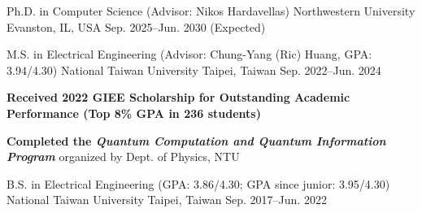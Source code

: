 

\begin{cventries}

    \cventry
    {Ph.D. in Computer Science (Advisor: Nikos Hardavellas)}
    {Northwestern University}
    {Evanston, IL, USA}
    {Sep. 2025--Jun. 2030 (Expected)}
    {
    }
    
    \cventry
    {M.S. in Electrical Engineering (Advisor: Chung-Yang (Ric) Huang, GPA: 3.94/4.30)}
    {National Taiwan University}
    {Taipei, Taiwan}
    {Sep. 2022--Jun. 2024}
    {
        \begin{cvitems}
            \item \textcolor{awesome}{\textbf{Received 2022 GIEE Scholarship for Outstanding Academic Performance (Top 8\% GPA in 236 students)}}
            \item \textcolor{awesome}{\textbf{Completed the \emph{Quantum Computation and Quantum Information Program}}} organized by Dept. of Physics, NTU
        \end{cvitems}
    }
    
    \cventry
    {B.S. in Electrical Engineering (GPA: 3.86/4.30; GPA since junior: 3.95/4.30)} %
    {National Taiwan University} %
    {Taipei, Taiwan} %
    {Sep. 2017--Jun. 2022} %
    {}
\end{cventries}
